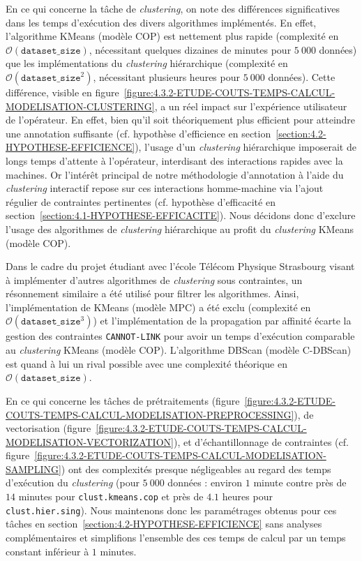 			En ce qui concerne la tâche de \textit{clustering}, on note des différences significatives dans les temps d'exécution des divers algorithmes implémentés.
			En effet, l'algorithme KMeans (modèle COP) est nettement plus rapide (complexité en $ \mathcal{O}(\texttt{dataset\_size}) $, nécessitant quelques dizaines de minutes pour $5~000$ données) que les implémentations du \textit{clustering} hiérarchique (complexité en $ \mathcal{O}(\texttt{dataset\_size}^{2}) $, nécessitant plusieurs heures pour $5~000$ données).
			Cette différence, visible en figure~\ref{figure:4.3.2-ETUDE-COUTS-TEMPS-CALCUL-MODELISATION-CLUSTERING}, a un réel impact sur l'expérience utilisateur de l'opérateur.
			En effet, bien qu'il soit théoriquement plus efficient pour atteindre une annotation suffisante (cf. hypothèse d'efficience en section~\ref{section:4.2-HYPOTHESE-EFFICIENCE}), l'usage d'un \textit{clustering} hiérarchique imposerait de longs temps d'attente à l'opérateur, interdisant des interactions rapides avec la machines.
			Or l'intérêt principal de notre méthodologie d'annotation à l'aide du \textit{clustering} interactif repose sur ces interactions homme-machine via l'ajout régulier de contraintes pertinentes (cf. hypothèse d'efficacité en section~\ref{section:4.1-HYPOTHESE-EFFICACITE}).
			Nous décidons donc d'exclure l'usage des algorithmes de \textit{clustering} hiérarchique au profit du \textit{clustering} KMeans (modèle COP).
			
			\begin{leftBarInformation}
				Dans le cadre du projet étudiant avec l'école Télécom Physique Strasbourg visant à implémenter d'autres algorithmes de \textit{clustering} sous contraintes, un résonnement similaire a été utilisé pour filtrer les algorithmes. Ainsi, l'implémentation de KMeans (modèle MPC) a été exclu (complexité en $ \mathcal{O}(\texttt{dataset\_size}^{3}) $) et l'implémentation de la propagation par affinité écarte la gestion des contraintes \texttt{CANNOT-LINK} pour avoir un temps d'exécution comparable au \textit{clustering} KMeans (modèle COP). L'algorithme DBScan (modèle C-DBScan) est quand à lui un rival possible avec une complexité théorique en $ \mathcal{O}(\texttt{dataset\_size}) $.
			\end{leftBarInformation}
			
			En ce qui concerne les tâches de prétraitements (figure~\ref{figure:4.3.2-ETUDE-COUTS-TEMPS-CALCUL-MODELISATION-PREPROCESSING}), de vectorisation (figure~\ref{figure:4.3.2-ETUDE-COUTS-TEMPS-CALCUL-MODELISATION-VECTORIZATION}), et d'échantillonnage de contraintes (cf. figure~\ref{figure:4.3.2-ETUDE-COUTS-TEMPS-CALCUL-MODELISATION-SAMPLING}) ont des complexités presque négligeables au regard des temps d'exécution du \textit{clustering} (pour $5~000$ données : environ $1$ minute contre près de $14$ minutes pour \texttt{clust.kmeans.cop} et près de $4.1$ heures pour \texttt{clust.hier.sing}).
			Nous maintenons donc les paramétrages obtenus pour ces tâches en section~\ref{section:4.2-HYPOTHESE-EFFICIENCE} sans analyses complémentaires et simplifions l'ensemble des ces temps de calcul par un temps constant inférieur à $1$ minutes.
			
